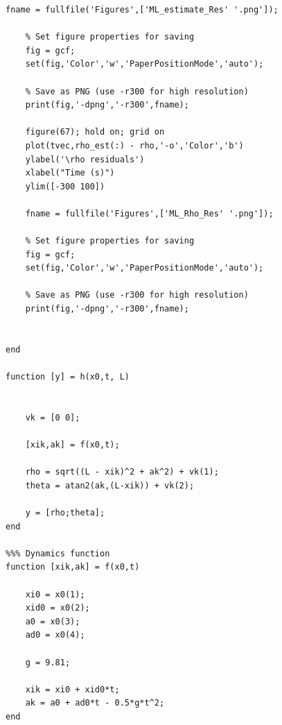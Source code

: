 \documentclass[11pt]{article}
\begin{document}
\begin{lstlisting}[style=matlab]
    fname = fullfile('Figures',['ML_estimate_Res' '.png']);

    % Set figure properties for saving
    fig = gcf;
    set(fig,'Color','w','PaperPositionMode','auto');
    
    % Save as PNG (use -r300 for high resolution)
    print(fig,'-dpng','-r300',fname);

    figure(67); hold on; grid on
    plot(tvec,rho_est(:) - rho,'-o','Color','b')
    ylabel('\rho residuals')
    xlabel("Time (s)")
    ylim([-300 100])

    fname = fullfile('Figures',['ML_Rho_Res' '.png']);

    % Set figure properties for saving
    fig = gcf;
    set(fig,'Color','w','PaperPositionMode','auto');
    
    % Save as PNG (use -r300 for high resolution)
    print(fig,'-dpng','-r300',fname);
    

end

function [y] = h(x0,t, L)

    
    vk = [0 0];

    [xik,ak] = f(x0,t);

    rho = sqrt((L - xik)^2 + ak^2) + vk(1);
    theta = atan2(ak,(L-xik)) + vk(2);

    y = [rho;theta];
end

%%% Dynamics function
function [xik,ak] = f(x0,t)

    xi0 = x0(1);
    xid0 = x0(2);
    a0 = x0(3);
    ad0 = x0(4);

    g = 9.81;

    xik = xi0 + xid0*t;
    ak = a0 + ad0*t - 0.5*g*t^2;
end
\end{lstlisting}
\end{document}
